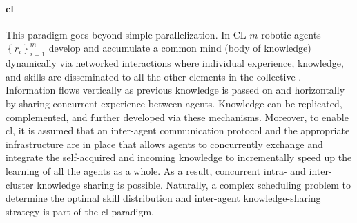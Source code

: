 \documentclass[12pt]{article}
\begin{document}
\paragraph*{\textbf{\Acl{cl}}}
This paradigm goes beyond simple parallelization. In CL $m$ robotic agents $ \left\lbrace r_i \right\rbrace_{i=1}^{m} $ develop and accumulate a common mind (body of knowledge) dynamically via networked interactions where individual experience, knowledge, and skills are disseminated to all the other elements in the collective \cite{Garavan2012CollectiveLearning}. Information flows vertically as previous knowledge is passed on and horizontally by sharing concurrent experience between agents. Knowledge can be replicated, complemented, and further developed via these mechanisms. Moreover, to enable \ac{cl}, it is assumed that an inter-agent communication protocol and the appropriate infrastructure are in place that allows agents to concurrently exchange and integrate the self-acquired and incoming knowledge to incrementally speed up the learning of all the agents as a whole. As a result, concurrent intra- and inter-cluster knowledge sharing is possible. Naturally, a complex scheduling problem to determine the optimal skill distribution and inter-agent knowledge-sharing strategy is part of the \ac{cl} paradigm. 
\end{document}
